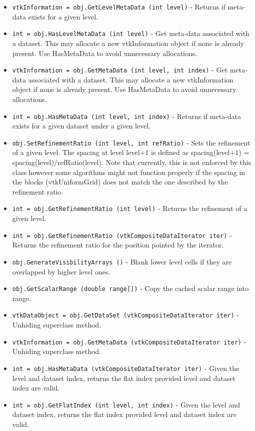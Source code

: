 \begin{itemize}
\item  \verb|vtkInformation = obj.GetLevelMetaData (int level)| -  Returns if meta-data exists for a given level.

\item  \verb|int = obj.HasLevelMetaData (int level)| -  Get meta-data associated with a dataset.  This may allocate a new
 vtkInformation object if none is already present. Use HasMetaData to
 avoid unnecessary allocations.

\item  \verb|vtkInformation = obj.GetMetaData (int level, int index)| -  Get meta-data associated with a dataset.  This may allocate a new
 vtkInformation object if none is already present. Use HasMetaData to
 avoid unnecessary allocations.

\item  \verb|int = obj.HasMetaData (int level, int index)| -  Returns if meta-data exists for a given dataset under a given level.

\item  \verb|obj.SetRefinementRatio (int level, int refRatio)| -  Sets the refinement of a given level. The spacing at level
 level+1 is defined as spacing(level+1) = spacing(level)/refRatio(level).
 Note that currently, this is not enforced by this class however
 some algorithms might not function properly if the spacing in
 the blocks (vtkUniformGrid) does not match the one described
 by the refinement ratio.

\item  \verb|int = obj.GetRefinementRatio (int level)| -  Returns the refinement of a given level.

\item  \verb|int = obj.GetRefinementRatio (vtkCompositeDataIterator iter)| -  Returns the refinement ratio for the position pointed by the iterator.

\item  \verb|obj.GenerateVisibilityArrays ()| -  Blank lower level cells if they are overlapped by higher
 level ones.

\item  \verb|obj.GetScalarRange (double range[])| -  Copy the cached scalar range into range.

\item  \verb|vtkDataObject = obj.GetDataSet (vtkCompositeDataIterator iter)| -  Unhiding superclass method.

\item  \verb|vtkInformation = obj.GetMetaData (vtkCompositeDataIterator iter)| -  Unhiding superclass method.

\item  \verb|int = obj.HasMetaData (vtkCompositeDataIterator iter)| -  Given the level and dataset index, returns the flat index provided level
 and dataset index are valid.

\item  \verb|int = obj.GetFlatIndex (int level, int index)| -  Given the level and dataset index, returns the flat index provided level
 and dataset index are valid.

\end{itemize}
